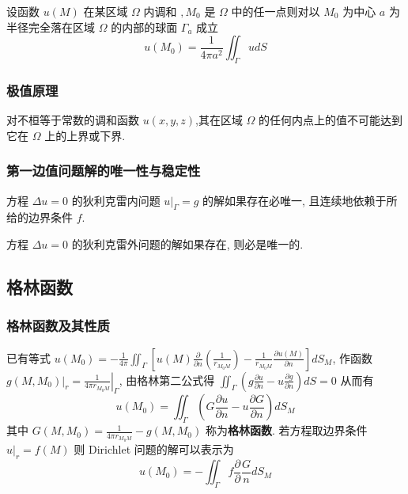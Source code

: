 \documentclass[10pt]{yerbaformat}
\begin{document}
\begin{theorem}
    设函数 $u(M)$ 在某区域 $\Omega$ 内调和 $, M_{0}$ 是 $\Omega$ 中的任一点则对以 $M_{0}$ 为中心 $a$ 为半径完全落在区域 $\Omega$ 的内部的球面 $\Gamma_{a}$ 成立 $$ u\left(M_{0}\right)=\frac{1}{4 \pi a^{2}} \iint_{\Gamma} u d S $$
\end{theorem}

\subsubsection{极值原理}
\begin{theorem}
    对不桓等于常数的调和函数 $u(x, y, z)$,其在区域 $\Omega$ 的任何内点上的值不可能达到它在 $\Omega$ 上的上界或下界.
\end{theorem}

\subsubsection{第一边值问题解的唯一性与稳定性}
\begin{theorem}
    方程 $\Delta u =0$ 的狄利克雷内问题 $\left.u\right|_{\Gamma}=g$ 的解如果存在必唯一, 且连续地依赖于所给的边界条件 $f$.
\end{theorem}

\begin{theorem} 
    方程 $\Delta u =0$ 的狄利克雷外问题的解如果存在, 则必是唯一的.
\end{theorem}

\subsection{格林函数}

\subsubsection{格林函数及其性质}
\par 已有等式 $u\left(M_{0}\right)=-\frac{1}{4 \pi} \iint_{\Gamma}\left[u(M) \frac{\partial}{\partial n}\left(\frac{1}{r_{M_{0} M}}\right)-\frac{1}{r_{M_{0} M}} \frac{\partial u(M)}{\partial n}\right] d S_{M}$, 作函数 $\left.g\left(M, M_{0}\right)\right|_{r}=\left.\frac{1}{4 \pi r_{M_{0} M}}\right|_{\Gamma}$, 由格林第二公式得 $\iint_{\Gamma}\left(g \frac{\partial u}{\partial n}-u \frac{\partial g}{\partial n}\right) d S=0$ 从而有 $$u\left(M_{0}\right)=\iint_{\Gamma}\left(G \frac{\partial u}{\partial n}-u \frac{\partial G}{\partial n}\right) d S_{M} $$ 其中 $G\left(M, M_{0}\right)=\frac{1}{4 \pi r_{M_{0} M}}-g\left(M, M_{0}\right)$ 称为\textbf{格林函数}. 若方程取边界条件 $\left.u\right|_{r}=f(M)$ 则 Dirichlet 问题的解可以表示为 $$u\left(M_{0}\right)=-\iint_{\Gamma} f \frac{\partial}{\partial} \frac{G}{n} d S_{M}$$
\end{document}

